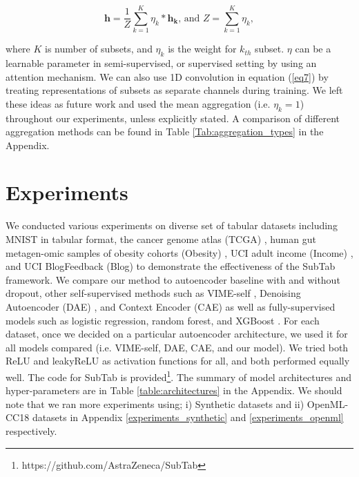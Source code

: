 \begin{equation}\label{eq7}
\bm{h}=\frac{1}{Z}\sum_{k=1}^{K} {\eta}_k * \bm{h_k}\mbox{, and } Z=\sum_{k=1}^{K} {\eta}_k,
\end{equation}

where $K$ is number of subsets, and $\eta_k$ is the weight for $k_{th}$ subset. $\eta$ can be a learnable parameter in semi-supervised, or supervised setting by using an attention mechanism. We can also use 1D convolution in equation (\ref{eq7}) by treating representations of subsets as separate channels during training. We left these ideas as future work and used the mean aggregation (i.e. $\eta_k=1$) throughout our experiments, unless explicitly stated. A comparison of different aggregation methods can be found in Table \ref{Tab:aggregation_types} in the Appendix.

\section{Experiments}\label{experiments_main}
We conducted various experiments on diverse set of tabular datasets including  MNIST \citep{lecun1998mnist} in tabular format, the cancer genome atlas (TCGA) \citep{tomczak2015cancer}, human gut metagen-omic samples of obesity cohorts (Obesity) \citep{oh2020deepmicro, le2013richness}, UCI adult income (Income) \citep{kohavi1996scaling}, and UCI BlogFeedback (Blog) \citep{buza2014feedback} to demonstrate the effectiveness of the SubTab framework. We compare our method to autoencoder baseline with and without dropout, other self-supervised methods such as VIME-self \citep{yoon2020vime}, Denoising Autoencoder (DAE) \citep{vincent2008extracting}, and Context Encoder (CAE) \citep{pathak2016context} as well as fully-supervised models such as logistic regression, random forest, and XGBoost \citep{Chen:2016:XST:2939672.2939785}. For each dataset, once we decided on a particular autoencoder architecture, we used it for all models compared (i.e. VIME-self, DAE, CAE, and our model). We tried both ReLU and leakyReLU as activation functions for all, and both performed equally well. The code for SubTab is provided\footnote{https://github.com/AstraZeneca/SubTab}. The summary of model architectures and hyper-parameters are in Table \ref{table:architectures} in the Appendix. We should note that we ran more experiments using; i) Synthetic datasets and ii) OpenML-CC18 datasets \citep{bischl2017openml} in Appendix \ref{experiments_synthetic} and \ref{experiments_openml} respectively.

